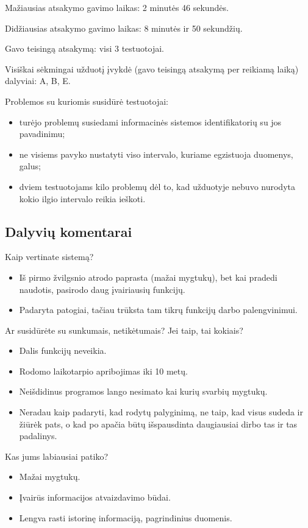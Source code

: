 Mažiausias atsakymo gavimo laikas: 2 minutės 46 sekundės.

Didžiausias atsakymo gavimo laikas: 8 minutės ir 50 sekundžių.

Gavo teisingą atsakymą: visi 3 testuotojai.

Visiškai sėkmingai užduotį įvykdė (gavo teisingą atsakymą per reikiamą 
laiką) dalyviai: A, B, E.

Problemos su kuriomis susidūrė testuotojai:
\begin{itemize}
  \item turėjo problemų susiedami informacinės sistemos identifikatorių
    su jos pavadinimu;
  \item ne visiems pavyko nustatyti viso intervalo, kuriame egzistuoja
    duomenys, galus;
  \item dviem testuotojams kilo problemų dėl to, kad užduotyje nebuvo
    nurodyta kokio ilgio intervalo reikia ieškoti.
\end{itemize}

\subsection{Dalyvių komentarai}

Kaip vertinate sistemą?
\begin{itemize}
  \item Iš pirmo žvilgsnio atrodo paprasta (mažai mygtukų), bet
    kai pradedi naudotis, pasirodo daug įvairiausių funkcijų.
  \item Padaryta patogiai, tačiau trūksta tam tikrų funkcijų darbo
    palengvinimui.
\end{itemize}

Ar susidūrėte su sunkumais, netikėtumais? Jei taip, tai kokiais?
\begin{itemize}
  \item Dalis funkcijų neveikia.
  \item Rodomo laikotarpio apribojimas iki 10 metų.
  \item Neišdidinus programos lango nesimato kai kurių svarbių mygtukų.
  \item Neradau kaip padaryti, kad rodytų palyginimą, ne taip, kad visus
    sudeda ir žiūrėk pats, o kad po apačia būtų išspausdinta daugiausiai
    dirbo tas ir tas padalinys.
\end{itemize}

Kas jums labiausiai patiko?
\begin{itemize}
  \item Mažai mygtukų.
  \item Įvairūs informacijos atvaizdavimo būdai.
  \item Lengva rasti istorinę informaciją, pagrindinius duomenis.
\end{itemize}

